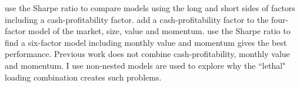 \textcite{fama2016choosing} use the Sharpe ratio to compare models using the long and short 
sides of factors including a cash-profitability factor.
\textcite{ball2016accruals} add a cash-profitability factor to the four-factor model of the 
market, size, value and momentum.
\textcite{barillas2015comparing} use the Sharpe ratio to find a six-factor model including 
monthly value and momentum gives the best performance.
Previous work does not combine cash-profitability, monthly value and momentum.
I use non-nested models are used to explore why the ``lethal" loading combination creates such 
problems.

